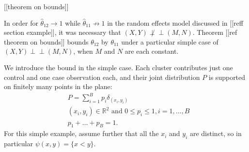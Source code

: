 \message{ !name(manuscript.tex)}\documentclass[12pt]{article}
\DeclareMathOperator{\AUC}{AUC}
\renewcommand{\P}{P}
\newcommand{\cind}{\perp \!\!\! \perp}
\newcommand{\aucindiv}{\theta_{11}}%
\newcommand{\aucpop}{\theta_{12}}%
\newcommand{\aucindivhat}{\hat{\theta}_{11}}%
\newcommand{\aucpophat}{\hat{\theta}_{12}}%
\newcommand{\B}{B}
\begin{document}
[[theorem on bounds]]


In order for $\aucpophat\to 1$ while $\aucindivhat\not\to 1$ in the
random effects model discussed in [[reff section example]], it was
necessary that $(X,Y)\not\cind (M,N)$. Theorem [[ref theorem on
bounds]] bounds $\aucpop$ by $\aucindiv$ under a particular simple
case of $(X,Y)\cind (M,N)$, when $M$ and $N$ are each constant.


We introduce the bound in the simple case. Each cluster contributes
just one control and one case observation each, and their joint
distribution $\P$ is supported on finitely many points in the
plane:  %
\begin{align}
  &\P = \sum_{i=1}^\B p_i \delta_{(x_i,y_i)}\\
  &(x_i,y_i) \in \mathbb{R}^2 \text{ and } 0\le p_i\le 1,i=1,\ldots,B\\
  &p_1+\ldots+p_\B=1.
\end{align}
For this simple example, assume further that all the $x_i$ and $y_i$ are distinct, so in
particular $\psi(x,y)=\{x<y\}$.
\end{document}
